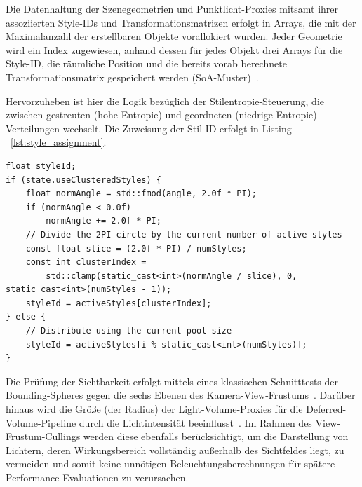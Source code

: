 Die Datenhaltung der Szenegeometrien und Punktlicht-Proxies mitsamt ihrer assoziierten Style-IDs und
Transformationsmatrizen erfolgt in Arrays, die mit der Maximalanzahl der erstellbaren Objekte vorallokiert wurden.
Jeder Geometrie wird ein Index zugewiesen, anhand dessen für jedes Objekt drei Arrays für die Style-ID, die räumliche
Position und die bereits vorab berechnete Transformationsmatrix gespeichert werden
(\ac{SoA}-Muster)~\cite[S.~793]{akenine-mollerRealtimeRendering2019}.

Hervorzuheben ist hier die Logik bezüglich der Stilentropie-Steuerung, die zwischen gestreuten (hohe Entropie) und
geordneten (niedrige Entropie) Verteilungen wechselt.
Die Zuweisung der Stil-ID erfolgt in Listing ~\ref{lst:style_assignment}.

\begin{listing}[htbp]
    \begin{verbatim}
float styleId;
if (state.useClusteredStyles) {
    float normAngle = std::fmod(angle, 2.0f * PI);
    if (normAngle < 0.0f)
        normAngle += 2.0f * PI;
    // Divide the 2PI circle by the current number of active styles
    const float slice = (2.0f * PI) / numStyles;
    const int clusterIndex =
        std::clamp(static_cast<int>(normAngle / slice), 0, static_cast<int>(numStyles - 1));
    styleId = activeStyles[clusterIndex];
} else {
    // Distribute using the current pool size
    styleId = activeStyles[i % static_cast<int>(numStyles)];
}
    \end{verbatim}
    \caption{C++ Code zur Berechnung der \texttt{styleId}-Verteilung basierend auf dem Cluster-Status in
    HyDra-Framework.}
    \label{lst:style_assignment}
\end{listing}

Die Prüfung der Sichtbarkeit erfolgt mittels eines klassischen Schnitttests der Bounding-Spheres gegen die sechs Ebenen
des Kamera-View-Frustums~\cite[S.~688, Abschn. \textit{Frustum Culling}]{gregoryGameEngineArchitecture2018}.
Darüber hinaus wird die Größe (der Radius) der Light-Volume-Proxies für die Deferred-Volume-Pipeline durch die
Lichtintensität beeinflusst~\cite[S.~891]{akenine-mollerRealtimeRendering2019}.
Im Rahmen des View-Frustum-Cullings werden diese ebenfalls berücksichtigt, um die Darstellung von Lichtern, deren
Wirkungsbereich vollständig außerhalb des Sichtfeldes liegt, zu vermeiden und somit keine unnötigen
Beleuchtungsberechnungen für spätere Performance-Evaluationen zu verursachen.

